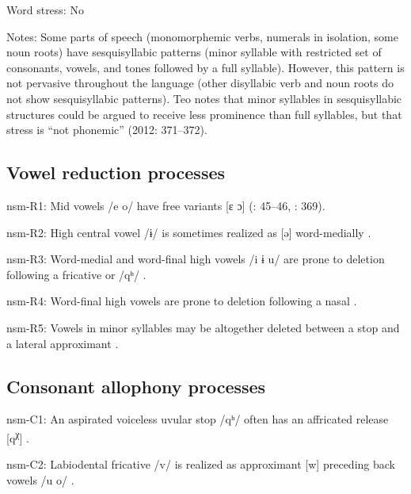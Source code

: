 {\begin{appendixdesc}
\item[Word stress:] No

\item[Notes:] Some parts of speech (monomorphemic verbs, numerals in isolation, some noun roots) have sesquisyllabic patterns  (minor syllable with restricted set of consonants, vowels, and tones followed by a full syllable). However, this pattern is not pervasive throughout the language (other disyllabic verb and noun roots do not show sesquisyllabic patterns). Teo notes that minor syllables in sesquisyllabic structures could be argued to receive less prominence than full syllables, but that stress is “not phonemic” (2012: 371--372).
\end{appendixdesc}
\subsection*{Vowel reduction processes}
\begin{appendixdesc}

\item[nsm-R1:] Mid vowels /e o/ have free variants [ɛ ɔ] (\citealt{Teo2009}: 45--46, \citealt{Teo2012}: 369).

\item[nsm-R2:] High central vowel /ɨ/ is sometimes realized as [ə] word-medially \citep[45]{Teo2009}.

\item[nsm-R3:] Word-medial and word-final high vowels /i ɨ u/ are prone to deletion following a fricative or /qʰ/ \citep[66]{Teo2009}.

\item[nsm-R4:] Word-final high vowels are prone to deletion following a nasal \citep[369]{Teo2012}.

\item[nsm-R5:] Vowels in minor syllables may be altogether deleted between a stop and a lateral approximant \citep[370]{Teo2012}.
\end{appendixdesc}
\subsection*{Consonant allophony processes}
\begin{appendixdesc}

\item[nsm-C1:] An aspirated voiceless uvular stop /qʰ/ often has an affricated release [q\textsuperscript{χ}] \citep[39]{Teo2009}.

\item[nsm-C2:] Labiodental fricative /v/ is realized as approximant [w] preceding back vowels /u o/ \citep[39]{Teo2009}.


\end{appendixdesc}}
